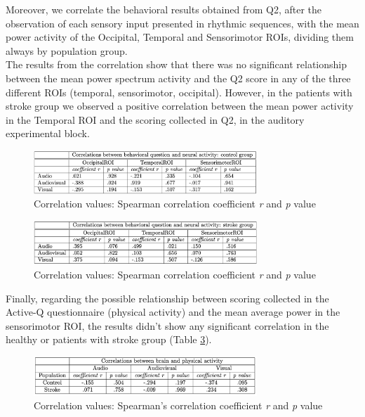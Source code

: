 Moreover, we  correlate the behavioral results obtained from Q2, after the observation of each sensory input presented in rhythmic sequences, with the mean power activity  of the Occipital, Temporal and Sensorimotor ROIs, dividing them always by population group.\\
The results from the correlation show that there was no significant relationship between the mean power spectrum activity and the Q2 score in any of the three different ROIs (temporal, sensorimotor, occipital).  However, in the patients with stroke group we observed a positive correlation between the mean power activity in the Temporal ROI and the scoring collected in Q2, in the auditory experimental block.
\begin{figure}[H]
    \centering
    \includegraphics[width=0.75\textwidth]{scatter_plots/correlation_q2_control.png}
    \caption{Correlation values: Spearman correlation coefficient \textit{r} and \textit{p} value}
    \label{fig: correlation values q2: control} 
\end{figure}

\begin{figure}[H]
    \centering
    \includegraphics[width=0.75\textwidth]{scatter_plots/correlation_q2_stroke.png}
    \caption{Correlation values: Spearman correlation coefficient \textit{r} and \textit{p} value}
    \label{fig correlation values q2: stroke} 
\end{figure}

Finally, regarding the possible relationship between scoring collected in the Active-Q questionnaire (physical activity) and the mean average power in the sensorimotor ROI, the results didn’t show any significant correlation in the healthy or patients with stroke group (Table \ref{fig: significance correlation activeq}). 
\begin{figure}[H]
    \centering
    \includegraphics[width=0.75\textwidth]{significance_tables/correlation_activeq_.png}
    \caption{Correlation values: Spearman's correlation coefficient \textit{r} and \textit{p} value}
    \label{fig: significance correlation activeq} 
\end{figure}

